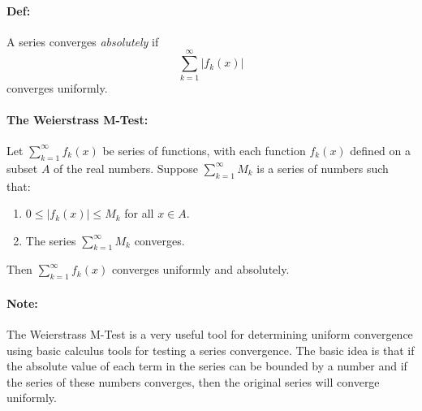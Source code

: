 \documentclass[10pt,a4paper]{article}
\begin{document}
\paragraph{Def:} A series converges \textit{absolutely} if 
$$ \sum_{k=1}^\infty |f_k(x)|$$
converges uniformly.

\paragraph{The Weierstrass M-Test:} Let $\sum_{k=1}^\infty f_k(x)$ be series of functions, with each function $f_k(x)$ defined on a subset $A$ of the real numbers. Suppose $\sum_{k=1}^\infty M_k$ is a series of numbers such that:
\begin{enumerate}
\item $0 \leq |f_k(x)| \leq M_k$ for all $x \in A$.
\item The series $\sum_{k=1}^\infty M_k$ converges.
\end{enumerate} 
Then $\sum_{k=1}^\infty f_k(x)$ converges uniformly and absolutely.

\paragraph{Note:} The Weierstrass M-Test is a very useful tool for determining uniform convergence using basic calculus tools for testing a series convergence. The basic idea is that if the absolute value of each term in the series can be bounded by a number and if the series of these numbers converges, then the original series will converge uniformly. 
\end{document}
